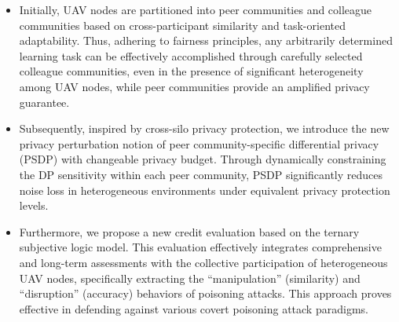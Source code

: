 \documentclass[lettersize,journal]{IEEEtran}
\begin{document}
\begin{itemize}
    \item Initially, UAV nodes are partitioned into peer communities and colleague communities based on cross-participant similarity and task-oriented adaptability. Thus, adhering to fairness principles, any arbitrarily determined learning task can be effectively accomplished through carefully selected colleague communities, even in the presence of significant heterogeneity among UAV nodes, while peer communities provide an amplified privacy guarantee. 
    \item Subsequently, inspired by cross-silo privacy protection, we introduce the new privacy perturbation notion of peer community-specific differential privacy (PSDP) with changeable privacy budget. Through dynamically constraining the DP sensitivity within each peer community, PSDP significantly reduces noise loss in heterogeneous environments under equivalent privacy protection levels.
    \item Furthermore, we propose a new credit evaluation based on the ternary subjective logic model. This evaluation effectively integrates comprehensive and long-term assessments with the collective participation of heterogeneous UAV nodes, specifically extracting the ``manipulation'' (similarity) and ``disruption'' (accuracy) behaviors of poisoning attacks. This approach proves effective in defending against various covert poisoning attack paradigms. 
    
\end{itemize}
\end{document}

